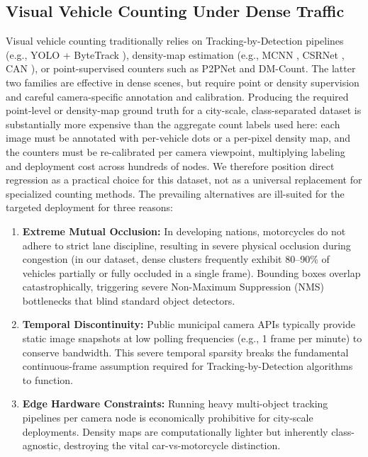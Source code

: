 \documentclass[journal,twocolumn]{IEEEtran}
\begin{document}
\subsection{Visual Vehicle Counting Under Dense Traffic}
Visual vehicle counting traditionally relies on Tracking-by-Detection pipelines (e.g., YOLO + ByteTrack \cite{yolo}), density-map estimation (e.g., MCNN \cite{mcnn}, CSRNet \cite{csrnet}, CAN \cite{can}), or point-supervised counters such as P2PNet and DM-Count. The latter two families are effective in dense scenes, but require point or density supervision and careful camera-specific annotation and calibration. Producing the required point-level or density-map ground truth for a city-scale, class-separated dataset is substantially more expensive than the aggregate count labels used here: each image must be annotated with per-vehicle dots or a per-pixel density map, and the counters must be re-calibrated per camera viewpoint, multiplying labeling and deployment cost across hundreds of nodes. We therefore position direct regression as a practical choice for this dataset, not as a universal replacement for specialized counting methods. The prevailing alternatives are ill-suited for the targeted deployment for three reasons:
\begin{enumerate}
    \item \textbf{Extreme Mutual Occlusion:} In developing nations, motorcycles do not adhere to strict lane discipline, resulting in severe physical occlusion during congestion (in our dataset, dense clusters frequently exhibit 80--90\% of vehicles partially or fully occluded in a single frame). Bounding boxes overlap catastrophically, triggering severe Non-Maximum Suppression (NMS) bottlenecks that blind standard object detectors.
    \item \textbf{Temporal Discontinuity:} Public municipal camera APIs typically provide static image snapshots at low polling frequencies (e.g., 1 frame per minute) to conserve bandwidth. This severe temporal sparsity breaks the fundamental continuous-frame assumption required for Tracking-by-Detection algorithms to function.
    \item \textbf{Edge Hardware Constraints:} Running heavy multi-object tracking pipelines per camera node is economically prohibitive for city-scale deployments. Density maps are computationally lighter but inherently class-agnostic, destroying the vital car-vs-motorcycle distinction.
\end{enumerate}
\end{document}
